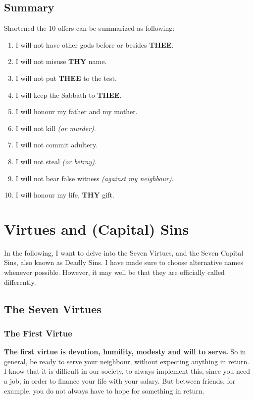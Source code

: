 \documentclass[12pt,a4paper]{article}
\newcommand{\Thee}[0]{\textbf{THEE}}
\newcommand{\Thy}[0]{\textbf{THY}}
\begin{document}
	\subsection{Summary}
		Shortened the 10 offers can be summarized as following:
		\\
		\begin{enumerate}[nosep]
			\item I will not have other gods before or besides {\Thee}.
			\item I will not misuse {\Thy} name.
			\item I will not put {\Thee} to the test.
			\item I will keep the Sabbath to {\Thee}.
			\item I will honour my father and my mother.
			\item I will not kill \textit{(or murder)}.
			\item I will not commit adultery.
			\item I will not steal \textit{(or betray)}.
			\item I will not bear false witness \textit{(against my neighbour)}.
			\item I will honour my life, {\Thy} gift.
		\end{enumerate}

	\newpage
	\section{Virtues and (Capital) Sins}
		In the following,
		I want to delve into the Seven Virtues,
		and the Seven Capital Sins,
		also known as Deadly Sins.
		I have made sure to choose alternative names whenever possible.
		However,
		it may well be that they are officially called differently.
	
	\subsection{The Seven Virtues}
	
	\subsubsection{The First Virtue}
		\textbf{The first virtue is devotion,
		humility,
		modesty and will to serve.}
		So in general,
		be ready to serve your neighbour,
		without expecting anything in return.
		I know that it is difficult in our society,
		to always implement this,
		since you need a job,
		in order to finance your life with your salary.
		But between friends,
		for example,
		you do not always have to hope for something in return.
\end{document}
